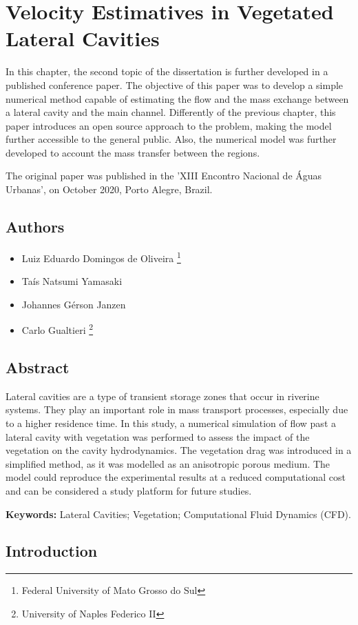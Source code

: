 \chapter{Velocity Estimatives in Vegetated Lateral Cavities}
\label{chap:art3}
In this chapter, the second topic of the dissertation is further developed in a published conference paper. The objective of this paper was to develop a simple numerical method capable of estimating the flow and the mass exchange between a lateral cavity and the main channel. Differently of the previous chapter, this paper introduces an open source approach to the problem, making the model further accessible to the general public. Also, the numerical model was further developed to account the mass transfer between the regions.

The original paper was published in the 'XIII Encontro Nacional de Águas Urbanas', on October 2020, Porto Alegre, Brazil.
\section*{Authors}
\begin{itemize}
    \item Luiz Eduardo Domingos de Oliveira \footnote{Federal University of Mato Grosso do Sul}
    \item Taís Natsumi Yamasaki \footnotemark[1]
    \item Johannes Gérson Janzen \footnotemark[1]
    \item Carlo Gualtieri \footnote{University of Naples Federico II}
\end{itemize}
\section*{Abstract}
Lateral cavities are a type of transient storage zones that occur in riverine systems. They play an important role in mass transport processes, especially due to a higher residence time. In this study, a numerical simulation of flow past a lateral cavity with vegetation was performed to assess the impact of the vegetation on the cavity hydrodynamics. The vegetation drag was introduced in a simplified method, as it was modelled as an anisotropic porous medium. The model could reproduce the experimental results at a reduced computational cost and can be considered a study platform for future studies.

\noindent\textbf{Keywords:} Lateral Cavities; Vegetation; Computational Fluid Dynamics (CFD).

\section{Introduction}

\printbibliography[segment=\therefsegment,heading=subbibliography, title={References}]
